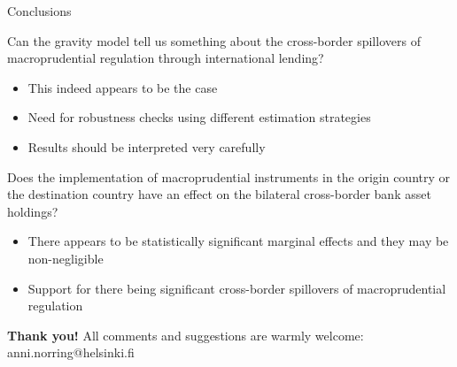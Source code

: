 \documentclass{beamer}
\begin{document}

\begin{frame}{Conclusions}
\begin{block}{Can the gravity model tell us something about the cross-border spillovers of macroprudential regulation through international lending?}
\begin{itemize}
\item This indeed appears to be the case
\item Need for robustness checks using different estimation strategies
\item Results should be interpreted very carefully
\end{itemize}
\end{block}
\begin{block}{Does the implementation of macroprudential instruments in the origin country or the destination country have an effect on the bilateral cross-border bank asset holdings?}
\begin{itemize}
\item There appears to be statistically significant marginal effects and they may be non-negligible
\item Support for there being significant cross-border spillovers of macroprudential regulation
\end{itemize}
\end{block}
\end{frame}

\begin{frame}
\begin{center}
\textbf{Thank you!}
\vskip 1cm
All comments and suggestions are warmly welcome: \\
anni.norring@helsinki.fi
\end{center}
\end{frame}
\end{document}
